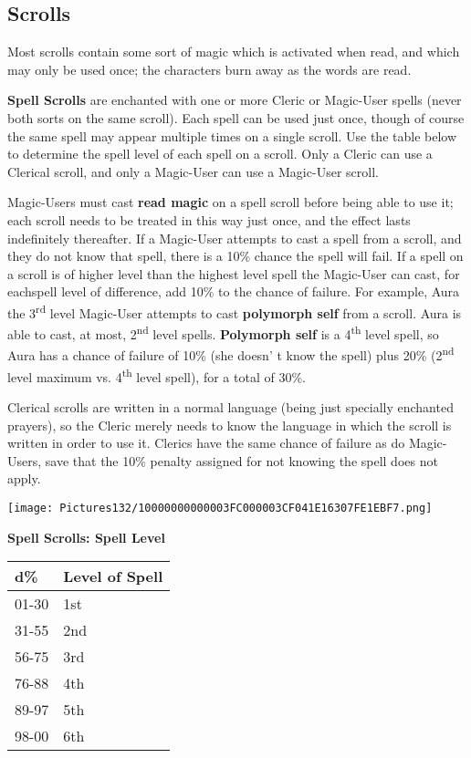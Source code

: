\documentclass[a4paper,twoside,openany,10pt]{book}
\begin{document}
\begin{multicols}{2}
\subsection{Scrolls}\label{scrolls-1}

Most scrolls contain some sort of magic which is activated when read, and which may only be used once; the characters burn away as the words are read.

\textbf{Spell Scrolls} are enchanted with one or more Cleric or Magic-User spells (never both sorts on the same scroll). Each spell can be used just once, though of course the same spell may appear multiple times on a single scroll. Use the table below to determine the spell level of each spell on a scroll. Only a Cleric can use a Clerical scroll, and only a Magic-User can use a Magic-User scroll.

Magic-Users must cast \textbf{read magic} on a spell scroll before being able to use it; each scroll needs to be treated in this way just once, and the effect lasts indefinitely thereafter. If a Magic-User attempts to cast a spell from a scroll, and they do not know that spell, there is a 10\% chance the spell will fail. If a spell on a scroll is of higher level than the highest level spell the Magic-User can cast, for eachspell level of difference, add 10\% to the chance of failure. For example, Aura the 3\textsuperscript{rd} level Magic-User attempts to cast \textbf{polymorph self} from a scroll. Aura is able to cast, at most, 2\textsuperscript{nd} level spells. \textbf{Polymorph self} is a 4\textsuperscript{th} level spell, so Aura has a chance of failure of 10\% (she doesn' t know the spell) plus 20\% (2\textsuperscript{nd} level maximum vs. 4\textsuperscript{th} level spell), for a total of 30\%.

Clerical scrolls are written in a normal language (being just specially enchanted prayers), so the Cleric merely needs to know the language in which the scroll is written in order to use it. Clerics have the same chance of failure as do Magic-Users, save that the 10\% penalty assigned for not knowing the spell does not apply.

\begin{flushleft} \texttt{[image: Pictures132/10000000000003FC000003CF041E16307FE1EBF7.png]}  \end{flushleft}


\textbf{Spell Scrolls: Spell Level}

\begin{tabular*}{0.93\linewidth}{@{\extracolsep{\fill}}ll}
\textbf{d\%} & \textbf{Level of Spell} \\\toprule
01-30 & 1st \\\hline
31-55 & 2nd \\\hline
56-75 & 3rd \\\hline
76-88 & 4th \\\hline
89-97 & 5th \\\hline
98-00 & 6th \\\bottomrule
\end{tabular*}\medskip


\end{multicols}
\end{document}
